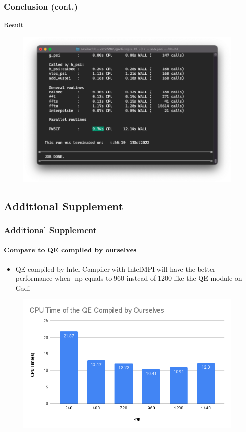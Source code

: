 \documentclass{beamer}
\begin{document}
\begin{frame}[fragile]
    \frametitle{Conclusion (cont.)}
    \begin{alertblock}{Result}
        \begin{figure}
            \includegraphics[width=.75\linewidth]{qe-multi}
        \end{figure}
    \end{alertblock}
\end{frame}

\subsection{Additional Supplement}

\begin{frame}
    \frametitle{Additional Supplement}
    \framesubtitle{Compare to QE compiled by ourselves}
        \begin{itemize}
            \item QE compiled by Intel Compiler with IntelMPI will have the better performance when -np equals to 960 instead of 1200 like the QE module on Gadi
        \end{itemize}
        \begin{figure}
            \includegraphics[width=.75\linewidth]{QEaddition.png}
        \end{figure}

\end{frame}
\end{document}
